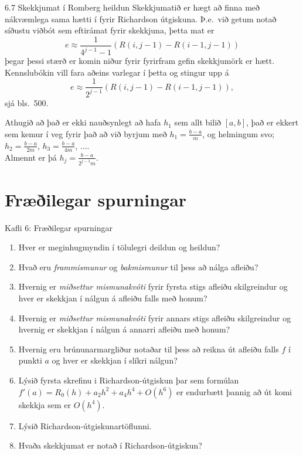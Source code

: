 \begin{frame}{6.7 Skekkjumat í Romberg heildun} 
Skekkjumatið er hægt að finna með nákvæmlega sama hætti í fyrir
Richardson útgiskuna. Þ.e.~við getum notað 
síðustu viðbót sem eftirámat fyrir skekkjuna, þetta mat er
\begin{equation*}
  e \approx \frac{1}{4^{j-1}-1}\left( R(i,j-1) - R(i-1,j-1)\right)
\end{equation*}
þegar þessi stærð er komin niður fyrir fyrirfram gefin skekkjumörk er
hætt. \pause
Kennslubókin vill fara aðeins varlegar í þetta og stingur upp á 
\begin{equation*}
  e \approx \frac{1}{2^{j-1}}\left( R(i,j-1) - R(i-1,j-1)\right),
\end{equation*}
sjá bls.~500.
\medskip\pause

Athugið að það er ekki nauðsynlegt að hafa $h_1$ sem allt bilið $[a,b]$, það er ekkert sem 
kemur í veg fyrir það að við byrjum með $h_1 = \frac{b-a}{m}$, og helmingum svo;
$h_2 = \frac{b-a}{2m}$, $h_3 = \frac{b-a}{4m}$, $\ldots$.\\
Almennt er þá $h_j=\frac{b-a}{2^{j-1}m}$.
\end{frame}


\section*{Fræðilegar spurningar}
\begin{frame}{Kafli 6: Fræðilegar spurningar}
  \begin{enumerate}
  \item  Hver er meginhugmyndin í tölulegri deildun og heildun?
  \item  Hvað eru {\it frammismunur} og {\it bakmismunur} til þess að
    nálga afleiðu?
  \item  Hvernig er {\it miðsettur mismunakvóti} fyrir fyrsta stigs
    afleiðu skilgreindur og hver 
    er skekkjan í nálgun á afleiðu falls með honum?
  \item  Hvernig er {\it miðsettur mismunakvóti} fyrir annars stigs
    afleiðu skilgreindur og hvernig er skekkjan í nálgun á annarri
    afleiðu með honum?
  \item  Hvernig eru  brúnunarmargliður notaðar til þess að
    reikna út afleiðu falls $f$ í punkti $a$ og hver er skekkjan í
    slíkri nálgun?
  \item  Lýsið fyrsta skrefinu i Richardson-útgiskun þar sem 
formúlan $f'(a)=R_0(h)+a_2h^2+a_4h^4+O(h^6)$ er endurbætt þannig að út
komi skekkja sem er $O(h^4)$.
  \item  Lýsið Richardson-útgiskunartöflunni. 
  \item  Hvaða skekkjumat er notað í Richardson-útgiskun?
  \end{enumerate}
\end{frame}


